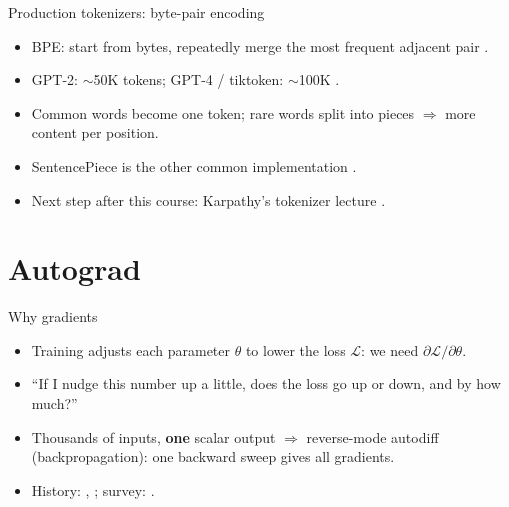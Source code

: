 \documentclass[aspectratio=169,11pt]{beamer}
\begin{document}
\begin{frame}{Production tokenizers: byte-pair encoding}
\begin{itemize}
  \item BPE: start from bytes, repeatedly merge the most frequent adjacent pair \parencite{gage1994bpe,sennrich2016bpe}.
  \item GPT-2: $\sim$50K tokens; GPT-4 / tiktoken: $\sim$100K \parencite{radford2019gpt2,openai2022tiktoken}.
  \item Common words become one token; rare words split into pieces $\Rightarrow$ more content per position.
  \item SentencePiece is the other common implementation \parencite{kudo2018sentencepiece}.
  \item Next step after this course: Karpathy's tokenizer lecture \parencite{karpathy2024tokenizervideo}.
\end{itemize}
\end{frame}

\section{Autograd}
\begin{frame}{Why gradients}
\begin{itemize}
  \item Training adjusts each parameter $\theta$ to lower the loss $\mathcal L$: we need $\partial\mathcal L/\partial\theta$.
  \item ``If I nudge this number up a little, does the loss go up or down, and by how much?''
  \item Thousands of inputs, \textbf{one} scalar output $\Rightarrow$ reverse-mode autodiff (backpropagation): one backward sweep gives all gradients.
  \item History: \textcite{linnainmaa1976taylor}, \textcite{rumelhart1986learning}; survey: \textcite{baydin2018autodiff}.
\end{itemize}
\end{frame}
\end{document}
